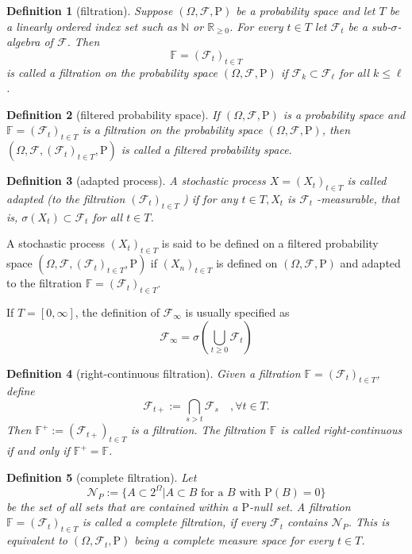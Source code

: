 \documentclass{article}
\newtheorem{definition}{Definition}[section]
\theoremstyle{nonumberplain}
\begin{document}
\begin{definition}[filtration]
Suppose $(\Omega,\mathcal{F},\mathrm{P})$ be a probability space and let $T$ be a linearly ordered index set such as $\mathbb{N}$ or $\mathbb{R}_{\ge 0}$. For every $t\in T$ let $\mathcal{F}_{t}$ be a sub-$\sigma$-algebra of $\mathcal{F}$. Then
\[
\mathbb{F} =(\mathcal{F}_{t})_{t\in T}
\]
is called a \emph{filtration} on the probability space $(\Omega,\mathcal{F},\mathrm{P})$ if $\mathcal {F}_{k}\subset \mathcal{F}_{\ell}$ for all $k\leq \ell$. 
\end{definition}
\begin{definition}[filtered probability space]
	If $(\Omega,\mathcal{F},\mathrm{P})$ is a probability space and $ \mathbb {F}=(\mathcal{F}_{t})_{t\in T }$ is a filtration on the probability space $(\Omega,\mathcal{F},\mathrm{P})$, then $(\Omega,\mathcal{F},(\mathcal{F}_{t})_{t\in T },\mathrm{P})$ is called a \emph{filtered probability space}.
\end{definition}

\begin{definition}[adapted process]
	A stochastic process $X=(X_{t})_{t \in T}$ is called \emph{adapted} (to the filtration $(\mathcal{F}_{t})_{t\in T}$ ) if for any $t \in T, X_{t}$ is $\mathcal{F}_{t}$ -measurable, that is, $\sigma(X_t)\subset \mathcal{F}_t$ for all $t\in T$.
\end{definition}

A stochastic process $(X_{t})_{t\in T }$ is said to be defined on a filtered probability space $(\Omega,\mathcal{F},(\mathcal{F}_{t})_{t\in T },\mathrm{P})$ if $(X_{n})_{t\in T }$ is defined on $(\Omega,\mathcal{F},\mathrm{P})$ and adapted to the filtration $\mathbb{F} =(\mathcal{F}_{t})_{t\in T }$. 

If $T=[0,\infty]$, the definition of $\mathcal{F}_{\infty}$ is usually specified as
\[
\mathcal{F}_{\infty}=\sigma\left(\bigcup_{t\ge0} \mathcal{F}_t\right)
\]

\begin{definition}[right-continuous filtration]
Given a filtration $\mathbb{F}=(\mathcal{F}_{t})_{t\in T}$, define
\[
\mathcal{F}_{t+}:=\bigcap_{s>t}\mathcal{F}_{s}\quad,\forall t\in T.
\]
Then $\mathbb{F}^+:=({\mathcal{F}}_{t+})_{t\in T}$ is a filtration. The filtration $\mathbb {F}$ is called \emph{right-continuous} if and only if $\mathbb{F}^{+}=\mathbb {F}$.
\end{definition}

\begin{definition}[complete filtration]
Let
\[\mathcal{N}_{P}:=\{A\subset 2^\Omega | A\subset B\text{ for a }B\text{ with }\mathrm{P}(B)=0\}
\]
be the set of all sets that are contained within a $\mathrm{P}$-null set. A filtration $\mathbb{F} =(\mathcal{F}_{t})_{t\in T}$ is called a \emph{complete filtration}, if every $\mathcal{F}_{t}$ contains $\mathcal{N}_{P}$. This is equivalent to $(\Omega,\mathcal{F}_{t},\mathrm{P})$ being a complete measure space for every $t\in T$.
\end{definition}
\end{document}

